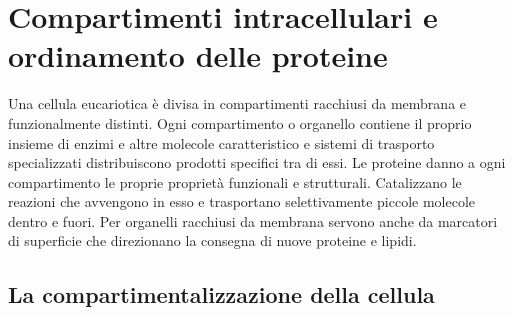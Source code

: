 \chapter{Compartimenti intracellulari e ordinamento delle proteine}
Una cellula eucariotica \`e divisa in compartimenti racchiusi da membrana e funzionalmente distinti. Ogni compartimento o organello contiene il proprio insieme di enzimi e altre molecole
caratteristico e sistemi di trasporto specializzati distribuiscono prodotti specifici tra di essi. Le proteine danno a ogni compartimento le proprie propriet\`a funzionali e strutturali.
Catalizzano le reazioni che avvengono in esso e trasportano selettivamente piccole molecole dentro e fuori. Per organelli racchiusi da membrana servono anche da marcatori di superficie
che direzionano la consegna di nuove proteine e lipidi. 
\section{La compartimentalizzazione della cellula}

